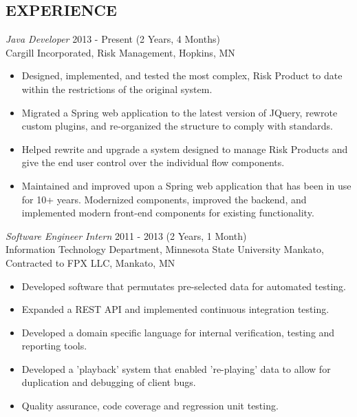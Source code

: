 \documentclass[line,margin]{res}
\begin{document}
\begin{resume}
\section{EXPERIENCE} {\sl Java Developer} \hfill 2013 - Present (2 Years, 4 Months) \\
                Cargill Incorporated,
                Risk Management, Hopkins, MN 
                \begin{itemize}  \itemsep -2pt %
                \item Designed, implemented, and tested the most complex, 
                    Risk Product to date within the restrictions of the original 
                    system.
                \item Migrated a Spring web application to the latest version 
                    of JQuery, rewrote custom plugins, and re-organized the 
                    structure to comply with standards.
                \item Helped rewrite and upgrade a system designed to manage 
                    Risk Products and give the end user control over the
		    individual flow components.
                \item Maintained and improved upon a Spring web application 
                    that has been in use for 10+ years. Modernized components, 
                    improved the backend, and implemented modern front-end 
                    components for existing functionality. 
                \end{itemize}
 
                {\sl Software Engineer Intern} \hfill            2011 - 2013 (2 Years, 1 Month) \\
                Information Technology Department, Minnesota State University Mankato, \\
                Contracted to FPX LLC, Mankato, MN 
                \begin{itemize}  \itemsep -2pt %
                \item Developed software that permutates pre-selected data for 
                    automated testing. 
                \item Expanded a REST API and implemented continuous 
                    integration testing. 
                \item Developed a domain specific language for internal 
                     verification, testing and reporting tools. 
                \item Developed a 'playback' system that enabled 're-playing' 
                    data to allow for duplication and debugging of client bugs. 
                \item Quality assurance, code coverage and regression unit testing. 
                \end{itemize} 


\end{resume}
\end{document}
